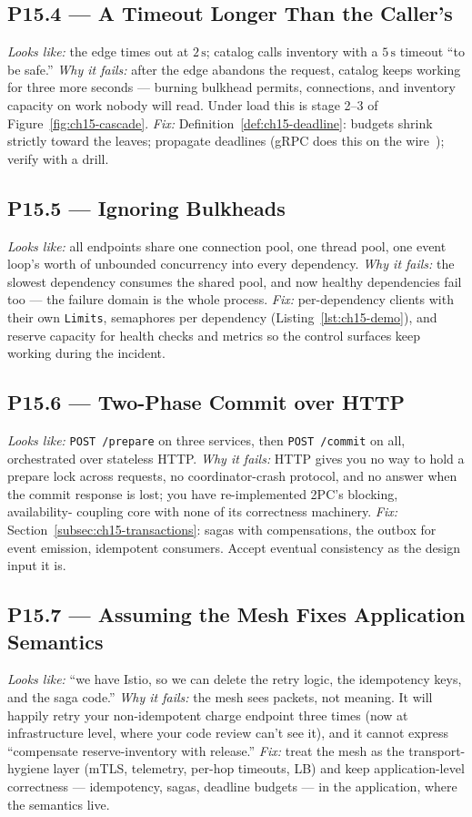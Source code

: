 \subsection*{P15.4 --- A Timeout Longer Than the Caller's}
\emph{Looks like:} the edge times out at $2\,\mathrm{s}$; catalog calls
inventory with a $5\,\mathrm{s}$ timeout ``to be safe.'' \emph{Why it
fails:} after the edge abandons the request, catalog keeps working for
three more seconds --- burning bulkhead permits, connections, and inventory
capacity on work nobody will read. Under load this is stage 2--3 of
Figure~\ref{fig:ch15-cascade}. \emph{Fix:}
Definition~\ref{def:ch15-deadline}: budgets shrink strictly toward the
leaves; propagate deadlines (gRPC does this on the wire~\cite{grpcdocs});
verify with a drill.

\subsection*{P15.5 --- Ignoring Bulkheads}
\emph{Looks like:} all endpoints share one connection pool, one thread
pool, one event loop's worth of unbounded concurrency into every
dependency. \emph{Why it fails:} the slowest dependency consumes the shared
pool, and now healthy dependencies fail too --- the failure domain is the
whole process. \emph{Fix:} per-dependency clients with their own
\texttt{Limits}, semaphores per dependency
(Listing~\ref{lst:ch15-demo}), and reserve capacity for health checks and
metrics so the control surfaces keep working during the incident.

\subsection*{P15.6 --- Two-Phase Commit over HTTP}
\emph{Looks like:} \texttt{POST /prepare} on three services, then
\texttt{POST /commit} on all, orchestrated over stateless HTTP.
\emph{Why it fails:} HTTP gives you no way to hold a prepare lock across
requests, no coordinator-crash protocol, and no answer when the commit
response is lost; you have re-implemented 2PC's blocking, availability-
coupling core with none of its correctness machinery. \emph{Fix:}
Section~\ref{subsec:ch15-transactions}: sagas with compensations, the
outbox for event emission, idempotent consumers. Accept eventual
consistency as the design input it is.

\subsection*{P15.7 --- Assuming the Mesh Fixes Application Semantics}
\emph{Looks like:} ``we have Istio, so we can delete the retry logic, the
idempotency keys, and the saga code.'' \emph{Why it fails:} the mesh sees
packets, not meaning. It will happily retry your non-idempotent charge
endpoint three times (now at infrastructure level, where your code review
can't see it), and it cannot express ``compensate reserve-inventory with
release.'' \emph{Fix:} treat the mesh as the transport-hygiene layer
(mTLS, telemetry, per-hop timeouts, LB) and keep application-level
correctness --- idempotency, sagas, deadline budgets --- in the
application, where the semantics live.

